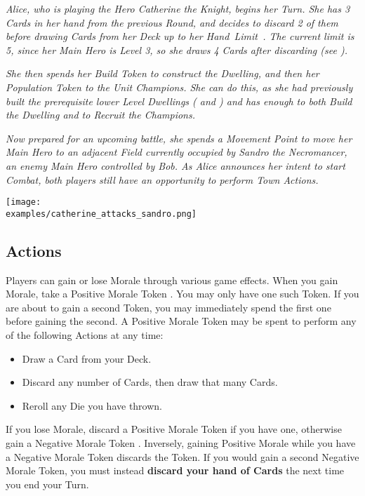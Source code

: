 \begin{multicols*}{2}
\textit{Alice, who is playing the Hero Catherine the Knight, begins her Turn.
She has 3 Cards in her hand from the previous Round, and decides to discard 2 of them before drawing Cards from her Deck up to her \mbox{Hand Limit .}
The current limit is 5, since her Main Hero is Level 3, so she draws 4 Cards after discarding (see ).}\par
\textit{She then spends her Build Token to construct the  Dwelling, and then her Population Token to  the  Unit Champions.
She can do this, as she had previously built the prerequisite lower Level Dwellings ( and ) and has enough  to both Build the Dwelling and to Recruit the Champions.}\par
\textit{Now prepared for an upcoming battle, she spends a Movement Point to move her Main Hero to an adjacent Field currently occupied by Sandro the Necromancer, an enemy Main Hero controlled by Bob.
As Alice announces her intent to start Combat, both players still have an opportunity to perform Town Actions.}\par

\texttt{[image: \\examples/catherine\_attacks\_sandro.png]}
\vspace*{\fill}
\columnbreak

\subsection*{ Actions}
Players can gain or lose Morale through various game effects.
When you gain Morale, take a Positive Morale Token .
You may only have one such Token.
If you are about to gain a second Token, you may immediately spend the first one before gaining the second.
A Positive Morale Token may be spent to perform any of the following Actions at any time:
\begin{itemize}
  \item Draw a Card from your Deck.
  \item Discard any number of Cards, then draw that many Cards.
  \item Reroll any Die you have thrown.
\end{itemize}
If you lose Morale, discard a Positive Morale Token  if you have one, otherwise gain a Negative Morale Token .
Inversely, gaining Positive Morale while you have a Negative Morale Token discards the Token.
If you would gain a second Negative Morale Token, you must instead \textbf{discard your hand of Cards} the next time you end your Turn.\par


\end{multicols*}
